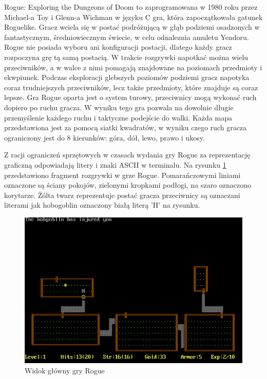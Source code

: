 \documentclass[12pt,twoside]{article}
\begin{document}
Rogue: Exploring the Dungeons of Doom to zaprogramowana w 1980 roku przez Michael-a Toy i Glenn-a Wichman w języku C gra, która zapoczątkowała gatunek Roguelike. Gracz wciela się w postać podróżującą w głąb podziemi osadzonych w fantastycznym, średniowiecznym świecie, w celu odnaleznia amuletu Yendoru. Rogue nie posiada wyboru ani konfiguracji postacji, dlatego każdy gracz rozpoczyna grę tą samą postacią. W trakcie rozgrywki napotkać można wielu przeciwników, a w walce z nimi pomagają znajdowane na poziomach przedmioty i ekwpiunek. Podczas eksploracji glebszych poziomów podziemi gracz napotyka coraz trudniejszych przeciwników, lecz także przedmioty, które znajduje są coraz lepsze. Gra Rogue oparta jest o system turowy, przeciwnicy mogą wykonać ruch dopiero po ruchu gracza. W wyniku tego gra pozwala na dowolnie długie przemyślenie każdego ruchu i taktyczne podejście do walki. Każda mapa przedstawiona jest za pomocą siatki kwadratów, w wyniku czego ruch gracza ograniczony jest do 8 kierunków: góra, dół, lewo, prawo i ukosy. 

Z racji ograniczeń sprzętowych w czasach wydania gry Rogue za reprezentację graficzną odpowiadają litery i znaki ASCII w terminalu. Na rysunku \ref{Rogue:scr1} przedstawiono fragment rozgrywki w grze Rogue. Pomarańczowymi liniami oznaczone są ściany pokojów, zielonymi kropkami podłogi, na szaro oznaczono korytarze. Żólta twarz reprezentuje postać gracza przeciwnicy są oznaczani literami jak hobogoblin oznaczony białą literą 'H' na rysunku.

\FloatBarrier
\begin{figure}[h]
	\centering
	\includegraphics[width=12cm]{images/rogue/scr1.png}
	\caption{Widok główny gry Rogue}
	\label{Rogue:scr1}
\end{figure}
\FloatBarrier
\end{document}
